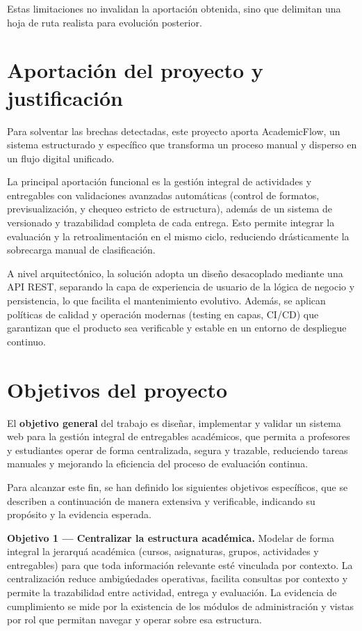 Estas limitaciones no invalidan la aportaci\'on obtenida,
sino que delimitan una hoja de ruta realista para evoluci\'on posterior.



\FloatBarrier
\section{Aportaci\'on del proyecto y justificaci\'on}

Para solventar las brechas detectadas, este proyecto aporta AcademicFlow, un sistema estructurado y espec\'ifico que transforma un proceso manual y disperso en un flujo digital unificado.

La principal aportaci\'on funcional es la gesti\'on integral de actividades y entregables con validaciones avanzadas autom\'aticas (control de formatos, previsualizaci\'on, y chequeo estricto de estructura), adem\'as de un sistema de versionado y trazabilidad completa de cada entrega. Esto permite integrar la evaluaci\'on y la retroalimentaci\'on en el mismo ciclo, reduciendo dr\'asticamente la sobrecarga manual de clasificaci\'on.

A nivel arquitect\'onico, la soluci\'on adopta un dise\~no desacoplado mediante una API REST, separando la capa de experiencia de usuario de la l\'ogica de negocio y persistencia, lo que facilita el mantenimiento evolutivo. Adem\'as, se aplican pol\'iticas de calidad y operaci\'on modernas (testing en capas, CI/CD) que garantizan que el producto sea verificable y estable en un entorno de despliegue continuo.

\FloatBarrier
\section{Objetivos del proyecto}

El \textbf{objetivo general} del trabajo es dise\~nar, implementar y validar un sistema web para la gesti\'on integral de entregables acad\'emicos, que permita a profesores y estudiantes operar de forma centralizada, segura y trazable, reduciendo tareas manuales y mejorando la eficiencia del proceso de evaluaci\'on continua.

Para alcanzar este fin, se han definido los siguientes objetivos espec\'ificos, que se describen a continuaci\'on de manera extensiva y verificable, indicando su prop\'osito y la evidencia esperada.

\textbf{Objetivo 1 — Centralizar la estructura acad\'emica.} Modelar de forma integral la jerarqu\'a acad\'emica (cursos, asignaturas, grupos, actividades y entregables) para que toda informaci\'on relevante est\'e vinculada por contexto. La centralizaci\'on reduce ambig\'uedades operativas, facilita consultas por contexto y permite la trazabilidad entre actividad, entrega y evaluaci\'on. La evidencia de cumplimiento se mide por la existencia de los m\'odulos de administraci\'on y vistas por rol que permitan navegar y operar sobre esa estructura.

